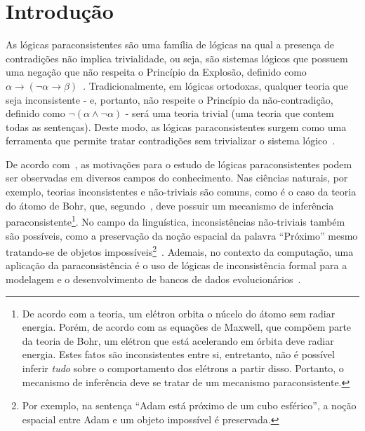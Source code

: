 \chapter{Introdução}
\label{cap:Introducao}


As lógicas paraconsistentes são uma família de lógicas na qual a presença de contradições não implica trivialidade, ou seja, são sistemas lógicos que possuem uma negação que não respeita o Princípio da Explosão, definido como $\alpha \rightarrow (\neg \alpha \rightarrow \beta)$~\cite{carnielli2007}. Tradicionalmente, em lógicas ortodoxas, qualquer teoria que seja inconsistente {-} e, portanto, não respeite o Princípio da não-contradição, definido como $\neg (\alpha \land \neg \alpha)$ {-} será uma teoria trivial (uma teoria que contem todas as sentenças). Deste modo, as lógicas paraconsistentes surgem como uma ferramenta que permite tratar contradições sem trivializar o sistema lógico~\cite{Carnielli_Coniglio_2016}.

De acordo com~, as motivações para o estudo de lógicas paraconsistentes podem ser observadas em diversos campos do conhecimento. Nas ciências naturais, por exemplo, teorias inconsistentes e não-triviais são comuns, como é o caso da teoria do átomo de Bohr, que, segundo~, deve possuir um mecanismo de inferência paraconsistente\footnote{De acordo com a teoria, um elétron orbita o núcelo do átomo sem radiar energia. Porém, de acordo com as equações de Maxwell, que compõem parte da teoria de Bohr, um elétron que está acelerando em órbita deve radiar energia. Estes fatos são inconsistentes entre si, entretanto, não é possível inferir \textit{tudo} sobre o comportamento dos elétrons a partir disso. Portanto, o mecanismo de inferência deve se tratar de um mecanismo paraconsistente.}. No campo da linguística, inconsistências não-triviais também são possíveis, como a preservação da noção espacial da palavra ``Próximo'' mesmo tratando-se de objetos impossíveis\footnote{Por exemplo, na sentença ``Adam está próximo de um cubo esférico'', a noção espacial entre Adam e um objeto impossível é preservada.}~\cite{McGinnis2013-MCGTUA}. Ademais, no contexto da computação, uma aplicação da paraconsistência é o uso de lógicas de inconsistência formal para a modelagem e o desenvolvimento de bancos de dados evolucionários~\cite{carnielli2000formal}.

